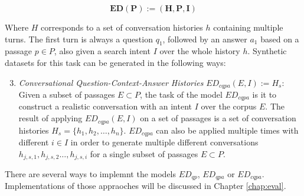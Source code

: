 \begin{equation}
    \mathbf{ED(P) := (H, P, I)}
    \label{eq:task_conversation}
\end{equation}

Where $H$ corresponds to a set of conversation histories $h$ containing multiple turns. The first turn is always a question $q_1$, followed by an answer $a_1$ based on a passage $p \in P$, also given a search intent $I$ over the whole history $h$. Synthetic datasets for this task can be generated in the following ways:

\begin{enumerate}
    \setcounter{enumi}{2} %
    \item \textit{Conversational Question-Context-Answer Histories} $ED_{cqpa}(E, I) := H_s$: Given a subset of passages $E \subset P$, the task of the model $ED_{cqpa}$ is it to construct a realistic conversation with an intent $I$ over the corpus $E$. The result of applying $ED_{cqpa}(E,I)$ on a set of passages is a set of conversation histories $H_s = \{h_1, h_2, \dots, h_n\}$. $ED_{cqpa}$ can also be applied multiple times with different $i \in I$ in order to generate multiple different conversations $h_{j,s,1}, h_{j,s,2} \dots , h_{j,s,i}$ for a single subset of passages $E \subset P$.
\end{enumerate}

There are several ways to implemnt the models $ED_{qp}$, $ED_{qpa}$ or $ED_{cqpa}$. Implementations of those appraoches will be discussed in Chapter \ref{chap:eval}. 



    
